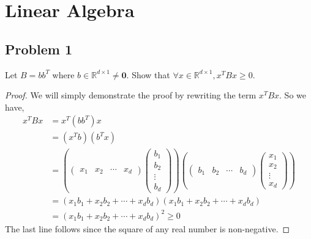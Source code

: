 \documentclass{article}
\theoremstyle{definition}
\begin{document}
\section{Linear Algebra}
    \subsection*{Problem 1}
        \begin{mdframed}[]
            Let $B = bb^T$ where $b\in\mathbb{R}^{d \times 1} \neq \bm 0$. Show that $\forall x \in \mathbb{R}^{d \times 1}, x^TBx \geqslant 0$.
        \end{mdframed}
        \begin{proof}
            We will simply demonstrate the proof by rewriting the term $x^TBx$. So we have,
            \begin{align*}
                x^TBx &= x^T(bb^T)x \\
                &= (x^Tb)(b^Tx)\\
                &= \left( \begin{pmatrix}
                    x_1 & x_2 & \cdots & x_d
                \end{pmatrix}\begin{pmatrix}
                    b_1 \\ b_2 \\ \vdots \\ b_d
                \end{pmatrix}\right)
                \left(
                    \begin{pmatrix}
                        b_1 & b_2 & \cdots & b_d
                    \end{pmatrix}
                    \begin{pmatrix}
                        x_1 \\ x_2 \\ \vdots \\ x_d
                    \end{pmatrix}
                \right)\\
                &=(x_1b_1 + x_2b_2 + \cdots + x_db_d)(x_1b_1 + x_2b_2 + \cdots + x_db_d)\\
                &=(x_1b_1 + x_2b_2 + \cdots + x_db_d)^2 \geqslant 0
            \end{align*}
            The last line follows since the square of any real number is non-negative.
        \end{proof}
\end{document}
